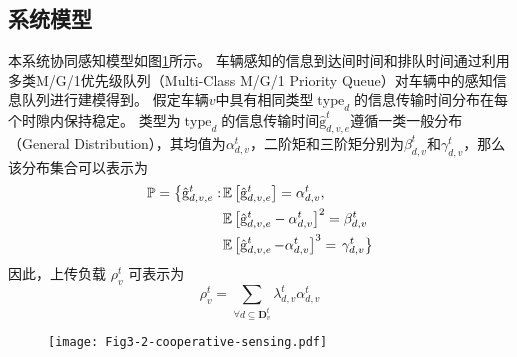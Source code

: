 \subsection{系统模型}
本系统协同感知模型如图\ref{fig 3-2}所示。
车辆感知的信息到达间时间和排队时间通过利用多类M/G/1优先级队列（Multi-Class M/G/1 Priority Queue）\cite{qian2020minimizing}对车辆中的感知信息队列进行建模得到。
假定车辆$v$中具有相同类型$\operatorname{type}_d$的信息传输时间分布在每个时隙内保持稳定。
类型为$\operatorname{type}_d$的信息传输时间$\operatorname{\hat{g}}_{d, v, e}^t$遵循一类一般分布（General Distribution），其均值为$\alpha_{d, v}^t$，二阶矩和三阶矩分别为$\beta_{d, v}^t$和$\gamma_{d, v}^t$，那么该分布集合可以表示为
\begin{align}
	\mathbb{P}=\left\{\hat{\mathrm{g}}_{d, v, e}^t:\right. & \mathbb{E}\left[\hat{\mathrm{g}}_{d, v, e}^t\right]=\alpha_{d, v}^t, \notag \\
	& \mathbb{E}\left[\hat{\mathrm{g}}_{d, v, e}^t-\alpha_{d, v}^t\right]^2=\beta_{d, v}^t \notag \\
	& \mathbb{E}\left[\operatorname{\hat{g}}_{d, v, e}^t-\alpha_{d, v}^t\right]^{3}=\left.\gamma_{d, v}^t \right\}
\end{align}
因此，上传负载 $\rho_{v}^{t}$ 可表示为 
\begin{equation}
    \rho_{v}^{t}=\sum_{\forall d \subseteq \mathbf{D}_v^t} \lambda_{d,v}^{t}  \alpha_{d, v}^t
\end{equation}

\begin{figure}[h]
\centering
  \texttt{[image: Fig3-2-cooperative-sensing.pdf]}
  \label{fig 3-2}
\end{figure}

